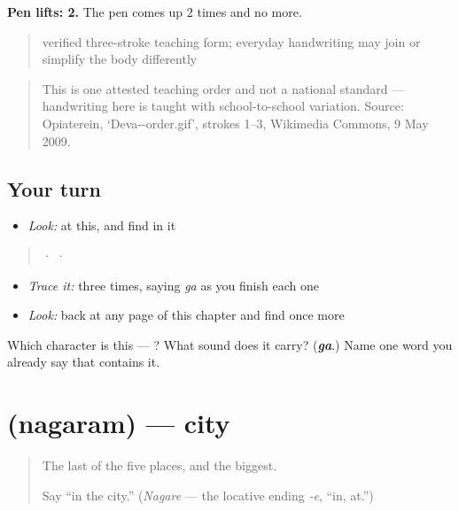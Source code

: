 \textbf{Pen lifts: 2.} The pen comes up 2 times and no more.

\begin{quote}
verified three-stroke teaching form; everyday handwriting may join or simplify the body differently
\end{quote}

\begin{quote}
This is one attested teaching order and not a national standard — handwriting here is taught with school-to-school variation. Source: Opiaterein, ‘Deva--order.gif’, strokes 1–3, Wikimedia Commons, 9 May 2009.
\end{quote}

\subsection*{Your turn}
\begin{itemize}
\raggedright
  \item \emph{Look:} at this, and find  in it
\end{itemize}

\begin{quote}
  ·    ·  
\end{quote}

\begin{itemize}
\raggedright
  \item \emph{Trace it:}  three times, saying \emph{ga} as you finish each one
  \item \emph{Look:} back at any page of this chapter and find  once more
\end{itemize}

\begin{tcolorbox}[breakable,colback=teal!4,colframe=teal!35!black,title={Before you move on}]
Which character is this — ? What sound does it carry? (\emph{\textbf{ga}}.) Name one word you already say that contains it.
\end{tcolorbox}
\section[\texorpdfstring{\sk{नगरम्} (nagaram)}{नगरम् (nagaram)}]{ (nagaram) — city}

\label{lesson:SA-C16-city}



\begin{quote}
The last of the five places, and the biggest.

Say \textquotedblleft{}in the city.\textquotedblright{} (\emph{Nagare} — the locative ending \emph{-e}, \textquotedblleft{}in, at.\textquotedblright{})
\end{quote}

